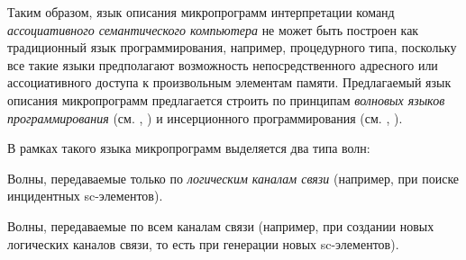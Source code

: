 Таким образом, язык описания микропрограмм интерпретации команд \textit{ассоциативного семантического компьютера} не может быть построен как традиционный язык программирования, например, процедурного типа, поскольку все такие языки предполагают возможность непосредственного адресного или ассоциативного доступа к произвольным элементам памяти. Предлагаемый язык описания микропрограмм предлагается строить по принципам \textit{волновых языков программирования} (см. , ) и инсерционного программирования (см. , ).

В рамках такого языка микропрограмм выделяется два типа волн:
\begin{textitemize}
	\item Волны, передаваемые только по \textit{логическим каналам связи} (например, при поиске инцидентных sc-элементов).
	\item Волны, передаваемые по всем каналам связи (например, при создании новых логических каналов связи, то есть при генерации новых sc-элементов).
\end{textitemize}

